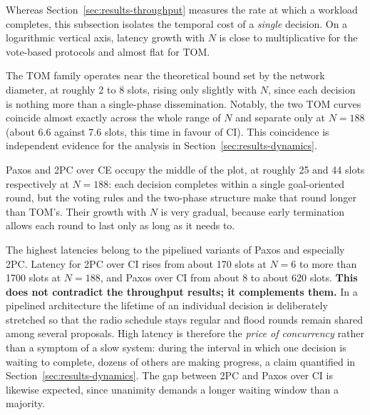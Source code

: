 \documentclass[journal]{IEEEtran}
\newcommand{\CI}{CI}                      %
\newcommand{\CE}{CE}                      %
\newcommand{\Nnodes}{N}                   %
\begin{document}

Whereas Section~\ref{sec:results-throughput} measures the rate at which a
workload completes, this subsection isolates the temporal cost of a
\emph{single} decision. On a logarithmic vertical axis, latency growth
with $\Nnodes$ is close to multiplicative for the vote-based protocols
and almost flat for TOM.

The TOM family operates near the theoretical bound set by the network
diameter, at roughly 2 to 8 slots, rising only slightly with $\Nnodes$,
since each decision is nothing more than a single-phase dissemination.
Notably, the two TOM curves coincide almost exactly across the whole
range of $\Nnodes$ and separate only at $\Nnodes = 188$ (about 6.6
against 7.6 slots, this time in favour of \CI). This coincidence is
independent evidence for the analysis in
Section~\ref{sec:results-dynamics}.

Paxos and 2PC over \CE{} occupy the middle of the plot, at roughly 25 and
44 slots respectively at $\Nnodes = 188$: each decision completes within
a single goal-oriented round, but the voting rules and the two-phase
structure make that round longer than TOM's. Their growth with $\Nnodes$
is very gradual, because early termination allows each round to last only
as long as it needs to.

The highest latencies belong to the pipelined variants of Paxos and
especially 2PC. Latency for 2PC over \CI{} rises from about 170 slots at
$\Nnodes = 6$ to more than 1700 slots at $\Nnodes = 188$, and Paxos over
\CI{} from about 8 to about 620 slots. \textbf{This does not contradict
the throughput results; it complements them.} In a pipelined
architecture the lifetime of an individual decision is deliberately
stretched so that the radio schedule stays regular and flood rounds
remain shared among several proposals. High latency is therefore the
\emph{price of concurrency} rather than a symptom of a slow system:
during the interval in which one decision is waiting to complete, dozens
of others are making progress, a claim quantified in
Section~\ref{sec:results-dynamics}. The gap between 2PC and Paxos over
\CI{} is likewise expected, since unanimity demands a longer waiting
window than a majority.
\end{document}
